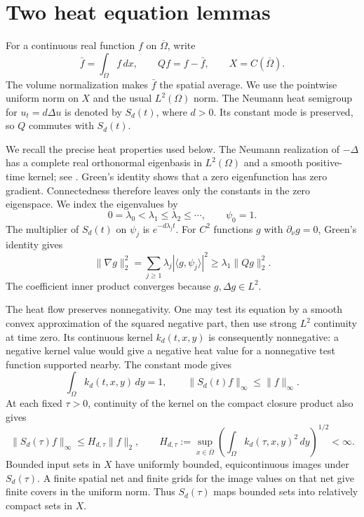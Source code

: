 \documentclass[11pt,a4paper]{article}
\begin{document}
\section{Two heat equation lemmas}\label{sec:heat}
For a continuous real function \(f\) on \(\overline\Omega\), write
\[
 \bar f=\int_\Omega f\,dx,\qquad Qf=f-\bar f,\qquad
 X=C(\overline\Omega).
\]
The volume normalization makes \(\bar f\) the spatial average.
We use the pointwise uniform norm on \(X\) and the usual \(L^2(\Omega)\)
norm. The Neumann heat semigroup for \(u_t=d\Delta u\) is denoted by
\(S_d(t)\), where \(d>0\). Its constant mode is preserved, so \(Q\)
commutes with \(S_d(t)\).

We recall the precise heat properties used below. The Neumann realization
of \(-\Delta\) has a complete real orthonormal eigenbasis in \(L^2(\Omega)\)
and a smooth positive-time kernel; see \cite[Chapter~4, Section~8,
Proposition~4.56 and Theorem~4.58]{Baudoin}. Green's identity
\cite[Proposition~4.49]{Baudoin} shows that a zero eigenfunction has zero
gradient. Connectedness therefore leaves only the constants in the zero
eigenspace. We index the eigenvalues by
\[
 0=\lambda_0<\lambda_1\le\lambda_2\le\cdots,\qquad \psi_0=1.
\]
The multiplier of \(S_d(t)\) on \(\psi_j\) is \(e^{-d\lambda_jt}\).
For \(C^2\) functions \(g\) with \(\partial_\nu g=0\), Green's identity
gives
\begin{equation}\label{eq:poincare}
 \|\nabla g\|_2^2
 =\sum_{j\ge1}\lambda_j|\langle g,\psi_j\rangle|^2
 \ge\lambda_1\|Qg\|_2^2 .
\end{equation}
The coefficient inner product converges because \(g,\Delta g\in L^2\).

The heat flow preserves nonnegativity. One may test its equation by a
smooth convex approximation of the squared negative part, then use
strong \(L^2\) continuity at time zero. Its continuous kernel \(k_d(t,x,y)\)
is consequently nonnegative: a negative kernel value would give a negative
heat value for a nonnegative test function supported nearby.
The constant mode gives
\[
 \int_\Omega k_d(t,x,y)\,dy=1,\qquad
 \|S_d(t)f\|_\infty\le\|f\|_\infty.
\]
At each fixed \(\tau>0\), continuity of the kernel on the compact closure
product also gives
\begin{equation}\label{eq:smoothing}
 \|S_d(\tau)f\|_\infty\le H_{d,\tau}\|f\|_2,\qquad
 H_{d,\tau}:=\sup_{x\in\overline\Omega}
       \left(\int_\Omega k_d(\tau,x,y)^2\,dy\right)^{1/2}<\infty .
\end{equation}
Bounded input sets in \(X\) have uniformly bounded, equicontinuous images
under \(S_d(\tau)\). A finite spatial net and finite grids for the image
values on that net give finite covers in the uniform norm. Thus
\(S_d(\tau)\) maps bounded sets into relatively compact sets in \(X\).
\end{document}
